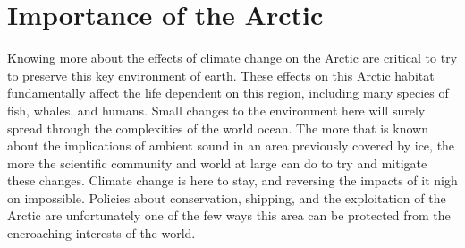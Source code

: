\section{Importance of the Arctic}

Knowing more about the effects of climate change on the Arctic are critical to try to preserve this key environment of earth. These effects on this Arctic habitat fundamentally affect the life dependent on this region, including many species of fish, whales, and humans. Small changes to the environment here will surely spread through the complexities of the world ocean. The more that is known about the implications of ambient sound in an area previously covered by ice, the more the scientific community and world at large can do to try and mitigate these changes. Climate change is here to stay, and reversing the impacts of it nigh on impossible. Policies about conservation, shipping, and the exploitation of the Arctic are unfortunately one of the few ways this area can be protected from the encroaching interests of the world.